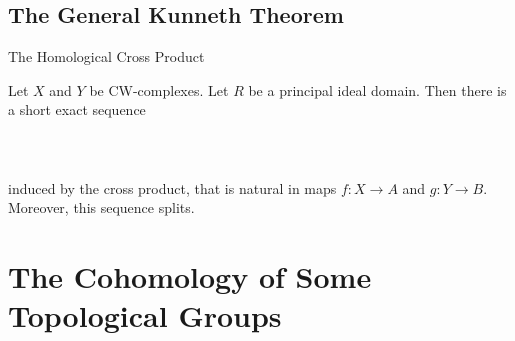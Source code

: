 \documentclass[a4paper]{article}
\begin{document}
\subsection{The General Kunneth Theorem}
\begin{defn}{The Homological Cross Product}{}
\end{defn}

\begin{thm}{}{} Let $X$ and $Y$ be CW-complexes. Let $R$ be a principal ideal domain. Then there is a short exact sequence \\~\\
\\~\\
induced by the cross product, that is natural in maps $f:X\to A$ and $g:Y\to B$. Moreover, this sequence splits. 
\end{thm}

\pagebreak
\section{The Cohomology of Some Topological Groups}
\end{document}

